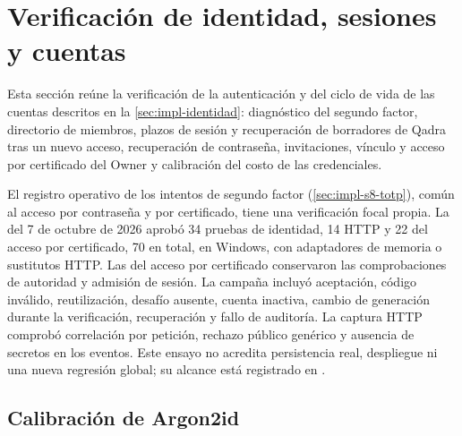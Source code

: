 
\section{Verificación de identidad, sesiones y cuentas}\label{sec:pruebas-identidad}

Esta sección reúne la verificación de la autenticación y del ciclo de vida de las cuentas descritos en la \cref{sec:impl-identidad}: diagnóstico del segundo factor, directorio de miembros, plazos de sesión y recuperación de borradores de Qadra tras un nuevo acceso, recuperación de contraseña, invitaciones, vínculo y acceso por certificado del Owner y calibración del costo de las credenciales.

El registro operativo de los intentos de segundo factor (\cref{sec:impl-s8-totp}),
común al acceso por contraseña y por certificado, tiene una verificación focal
propia. La del 7 de octubre de 2026 aprobó 34
pruebas de identidad, 14 HTTP y 22 del acceso por certificado, 70 en total, en
Windows, con adaptadores de memoria o sustitutos HTTP. Las del acceso por
certificado conservaron las comprobaciones de autoridad y admisión de sesión. La campaña incluyó
aceptación, código inválido, reutilización, desafío ausente, cuenta inactiva,
cambio de generación durante la verificación, recuperación y fallo de auditoría.
La captura HTTP comprobó correlación por petición, rechazo público genérico y
ausencia de secretos en los eventos. Este ensayo no acredita persistencia real,
despliegue ni una nueva regresión global; su alcance está registrado en
.











\subsection{Calibración de Argon2id}\label{sec:pruebas-argon2}

